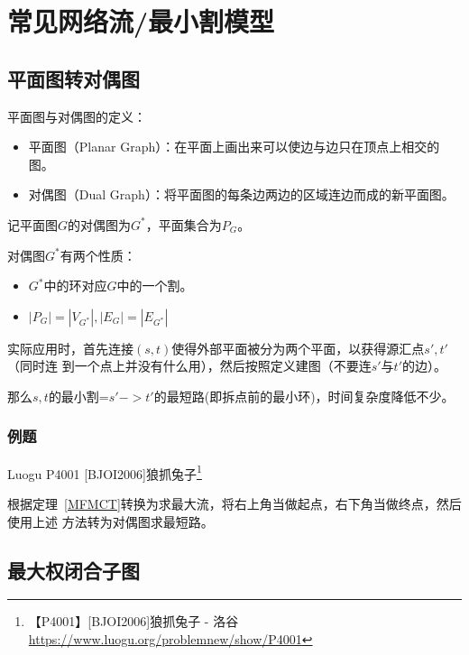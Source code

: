\section{常见网络流/最小割模型}
\subsection{平面图转对偶图}

平面图与对偶图的定义：
\begin{itemize}
	\item 平面图（Planar Graph）：在平面上画出来可以使边与边只在顶点上相交的图。
	\item 对偶图（Dual Graph）：将平面图的每条边两边的区域连边而成的新平面图。
\end{itemize}

记平面图$G$的对偶图为$G^*$，平面集合为$P_G$。

对偶图$G^*$有两个性质：
\begin{itemize}
	\item
	      \begin{property}
		      $G^*$中的环对应$G$中的一个割。
	      \end{property}
	\item
	      \begin{property}
		      $|P_G|=|V_{G^*}|,|E_G|=|E_{G^*}|$
	      \end{property}
\end{itemize}

实际应用时，首先连接$(s,t)$使得外部平面被分为两个平面，以获得源汇点$s',t'$（同时连
到一个点上并没有什么用），然后按照定义建图（不要连$s'$与$t'$的边）。

那么$s,t$的最小割=$s'->t'$的最短路(即拆点前的最小环)，时间复杂度降低不少。

\subsubsection{例题}

Luogu P4001 [BJOI2006]狼抓兔子\footnote{【P4001】[BJOI2006]狼抓兔子 - 洛谷
\url{https://www.luogu.org/problemnew/show/P4001}}

根据定理~\ref{MFMCT}转换为求最大流，将右上角当做起点，右下角当做终点，然后使用上述
方法转为对偶图求最短路。



\subsection{最大权闭合子图}

